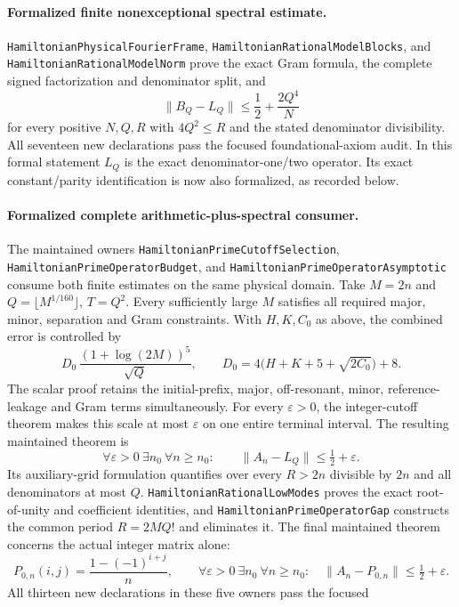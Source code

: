 \paragraph{Formalized finite nonexceptional spectral estimate.}
\texttt{HamiltonianPhysicalFourierFrame},
\texttt{HamiltonianRationalModelBlocks}, and
\texttt{HamiltonianRationalModelNorm} prove the exact Gram formula,
the complete signed factorization and denominator split, and
\[
 \|B_Q-L_Q\|\leq\frac12+\frac{2Q^4}{N}
\]
for every positive \(N,Q,R\) with \(4Q^2\leq R\)
and the stated denominator divisibility.
All seventeen new declarations pass the focused foundational-axiom
audit. In this formal statement \(L_Q\) is the exact
denominator-one/two operator. Its exact constant/parity
identification is now also formalized, as recorded below.

\paragraph{Formalized complete arithmetic-plus-spectral consumer.}
The maintained owners \texttt{HamiltonianPrimeCutoffSelection},
\texttt{HamiltonianPrimeOperatorBudget}, and
\texttt{HamiltonianPrimeOperatorAsymptotic} consume both finite
estimates on the same physical domain.
Take \(M=2n\) and \(Q=\lfloor M^{1/160}\rfloor\), \(T=Q^2\).
Every sufficiently large \(M\) satisfies all required major,
minor, separation and Gram constraints.
With \(H,K,C_0\) as above, the combined error is controlled by
\[
 D_0\,\frac{(1+\log(2M))^5}{\sqrt Q},
 \qquad D_0=4\bigl(H+K+5+\sqrt{2C_0}\bigr)+8.
\]
The scalar proof retains the initial-prefix, major, off-resonant,
minor, reference-leakage and Gram terms simultaneously.
For every \(\varepsilon>0\), the integer-cutoff theorem makes this
scale at most \(\varepsilon\) on one entire terminal interval.
The resulting maintained theorem is
\[
 \forall\varepsilon>0\ \exists n_0\
 \forall n\geq n_0:\qquad \|A_n-L_Q\|\leq\tfrac12+\varepsilon .
\]
Its auxiliary-grid formulation quantifies over every \(R>2n\)
divisible by \(2n\) and all denominators at most \(Q\).
\texttt{HamiltonianRationalLowModes} proves the exact root-of-unity
and coefficient identities, and
\texttt{HamiltonianPrimeOperatorGap} constructs the common period
\(R=2M Q!\) and eliminates it. The final maintained theorem concerns
the actual integer matrix alone:
\[
 P_{0,n}(i,j)=\frac{1-(-1)^{i+j}}n,\qquad
 \forall\varepsilon>0\ \exists n_0\
 \forall n\geq n_0:\quad
       \|A_n-P_{0,n}\|\leq\tfrac12+\varepsilon.
\]
All thirteen new declarations in these five owners pass the focused
